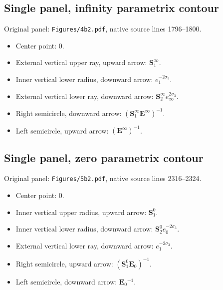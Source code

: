 \documentclass[11pt]{article}
\numberwithin{equation}{section}
\numberwithin{equation}{section}
\begin{document}
\subsection*{Single panel, infinity parametrix contour}
\noindent Original panel: \texttt{Figures/4b2.pdf}, native source lines 1796--1800.
\begin{itemize}\itemsep=0pt
\item Center point: $0$.
\item External vertical upper ray, upward arrow: $\mathbf{S}_1^\infty{}$.
\item Inner vertical lower radius, downward arrow: $e_1^{-2\sigma_3}$.
\item External vertical lower ray, downward arrow: $\mathbf{S}_2^\infty{}e_\infty^{2\sigma_3}$.
\item Right semicircle, downward arrow: $(\mathbf{S}_1^\infty{}\mathbf{E}^\infty{})^{-1}$.
\item Left semicircle, upward arrow: $(\mathbf{E}^\infty{})^{-1}$.
\end{itemize}

\subsection*{Single panel, zero parametrix contour}
\noindent Original panel: \texttt{Figures/5b2.pdf}, native source lines 2316--2324.
\begin{itemize}\itemsep=0pt
\item Center point: $0$.
\item Inner vertical upper radius, upward arrow: $\mathbf{S}_1^0{}$.
\item Inner vertical lower radius, downward arrow: $\mathbf{S}_2^0{}e_0^{-2\sigma_3}$.
\item External vertical lower ray, downward arrow: $e_1^{-2\sigma_3}$.
\item Right semicircle, upward arrow: $(\mathbf{S}_1^0{}\mathbf{E}_0{})^{-1}$.
\item Left semicircle, downward arrow: $\mathbf{E}_0{}^{-1}$.
\end{itemize}
\end{document}
